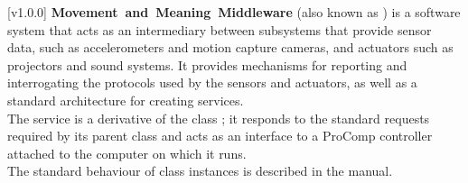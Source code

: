 [v1.0.0]
\textbf{Movement~and~Meaning~Middleware} (also known as \mplusm{}) is a software system
that acts as an intermediary between subsystems that provide sensor data, such as
accelerometers and motion capture cameras, and actuators such as projectors and sound
systems.
It provides mechanisms for reporting and interrogating the protocols used by the sensors
and actuators, as well as a standard architecture for creating services.\\

The \PCI{} service is a derivative of the \mplusm{} class ;
it responds to the standard requests required by its parent class and acts as an interface
to a ProComp controller attached to the computer on which it runs.\\

The standard behaviour of  class instances is described in
the \emph{\MMM} manual.
\primaryEnd{}
